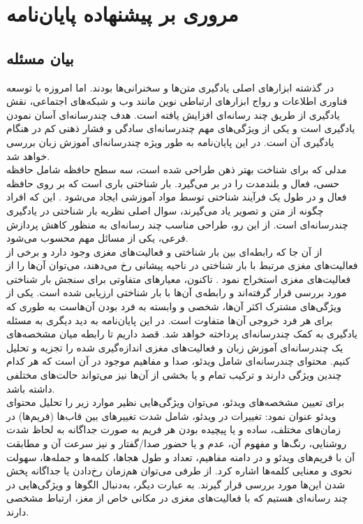 \section{مروری بر پیشنهاده پایان‌نامه}
\subsection{بیان مسئله}
در گذشته ابزارهای اصلی یادگیری متن‌ها و سخنرانی‌ها بودند. اما امروزه با توسعه فناوری اطلاعات و رواج ابزارهای ارتباطی نوین مانند وب و شبکه‌های اجتماعی، نقش یادگیری از طریق چند رسانه‌ای افزایش یافته است. هدف چندرسانه‌ای آسان نمودن یادگیری است و یکی از ویژگی‌های مهم چندرسانه‌ای سادگی و فشار ذهنی کم در هنگام یادگیری آن است. در این پایان‌نامه به طور ویژه چندرسانه‌ای آموزش زبان بررسی خواهد شد.
\\
مدلی که برای شناخت بهتر ذهن طراحی شده است، سه سطح حافظه شامل حافظه حسی، فعال و بلندمدت را در بر می‌گیرد. بار شناختی باری است که بر روی حافظه فعال و در طول یک فرآیند شناختی توسط مواد آموزشی ایجاد می‌شود
\cite{paas2003cognitive}
. این که افراد چگونه از متن و تصویر یاد می‌گیرند، سوال اصلی نظریه بار شناختی در یادگیری چندرسانه‌ای است. از این رو، طراحی مناسب چند رسانه‌ای به منظور کاهش پردازش فرعی، یکی از مسائل مهم محسوب می‌شود.
\\
از آن جا که رابطه‌ای بین بار شناختی و فعالیت‌های مغزی وجود دارد
\cite{yan2009spontaneous}
و برخی از فعالیت‌های مغزی مرتبط با بار شناختی در ناحیه پیشانی رخ می‌دهند، می‌توان آن‌ها را از فعالیت‌های مغزی استخراج نمود
\cite{salmon1996regional}
. تاکنون، معیار‌های متفاوتی برای سنجش بار شناختی مورد بررسی قرار گرفته‌اند و رابطه‌ی آن‌ها با بار شناختی ارزیابی شده است. یکی از ویژگی‌های مشترک اکثر آن‌ها، شخصی و وابسته به فرد بودن آن‌هاست به طوری که برای هر فرد خروجی آن‌ها متفاوت است. در این پایان‌نامه به دید دیگری به مسئله یادگیری به کمک چندرسانه‌ای پرداخته خواهد شد. قصد داریم تا رابطه میان مشخصه‌های یک چندرسانه‌ای آموزش زبان و فعالیت‌های مغزی انداز‌ه‌گیری شده را تجزیه و تحلیل کنیم. محتوای چندرسانه‌ای شامل ویدئو، صدا و مفاهیم موجود در آن است که هر کدام چندین ویژگی دارند و ترکیب تمام و یا بخشی از آن‌ها نیز می‌تواند حالت‌های مختلفی داشته باشد.
\\
برای تعیین مشخصه‌های ویدئو، می‌توان ویژگی‌هایی نظیر موارد زیر را تحلیل محتوای ویدئو عنوان نمود: تغییرات در ویدئو، شامل شدت تغییرهای بین قاب‌ها (فریم‌ها) در زمان‌های مختلف، ساده و یا پیچیده بودن هر فریم به صورت جداگانه به لحاظ شدت روشنایی، رنگ‌ها و مفهوم آن، عدم و یا حضور صدا/گفتار و نیز سرعت آن و مطابقت آن با فریم‌های ویدئو و در دامنه مفاهیم، تعداد و طول هجا‌ها، کلمه‌ها و جمله‌ها، سهولت نحوی و معنایی کلمه‌ها اشاره کرد. از طرفی می‌توان هم‌زمان رخ‌دادن یا جداگانه پخش شدن این‌ها مورد بررسی قرار گیرند. به عبارت دیگر، به‌دنبال الگو‌ها و ویژگی‌هایی در چند رسانه‌ای هستیم که با فعالیت‌های مغزی در مکانی خاص از مغز، ارتباط مشخصی دارند.
